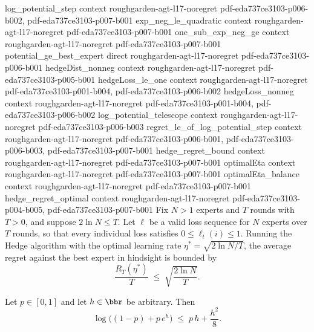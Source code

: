 \begin{theorem}
\proofstep
  {log_potential_step}
  {context}
  {roughgarden-agt-l17-noregret}
  {pdf-eda737ce3103-p006-b002,
    pdf-eda737ce3103-p007-b001}
\proofstep
  {exp_neg_le_quadratic}
  {context}
  {roughgarden-agt-l17-noregret}
  {pdf-eda737ce3103-p007-b001}
\proofstep
  {one_sub_exp_neg_ge}
  {context}
  {roughgarden-agt-l17-noregret}
  {pdf-eda737ce3103-p007-b001}
\proofstep
  {potential_ge_best_expert}
  {direct}
  {roughgarden-agt-l17-noregret}
  {pdf-eda737ce3103-p006-b001}
\proofstep
  {hedgeDist_nonneg}
  {context}
  {roughgarden-agt-l17-noregret}
  {pdf-eda737ce3103-p005-b001}
\proofstep
  {hedgeLoss_le_one}
  {context}
  {roughgarden-agt-l17-noregret}
  {pdf-eda737ce3103-p001-b004,
    pdf-eda737ce3103-p006-b002}
\proofstep
  {hedgeLoss_nonneg}
  {context}
  {roughgarden-agt-l17-noregret}
  {pdf-eda737ce3103-p001-b004,
    pdf-eda737ce3103-p006-b002}
\proofstep
  {log_potential_telescope}
  {context}
  {roughgarden-agt-l17-noregret}
  {pdf-eda737ce3103-p006-b003}
\proofstep
  {regret_le_of_log_potential_step}
  {context}
  {roughgarden-agt-l17-noregret}
  {pdf-eda737ce3103-p006-b001,
    pdf-eda737ce3103-p006-b003,
    pdf-eda737ce3103-p007-b001}
\proofstep
  {hedge_regret_bound}
  {context}
  {roughgarden-agt-l17-noregret}
  {pdf-eda737ce3103-p007-b001}
\proofstep
  {optimalEta}
  {context}
  {roughgarden-agt-l17-noregret}
  {pdf-eda737ce3103-p007-b001}
\proofstep
  {optimalEta_balance}
  {context}
  {roughgarden-agt-l17-noregret}
  {pdf-eda737ce3103-p007-b001}
\proofstep
  {hedge_regret_optimal}
  {context}
  {roughgarden-agt-l17-noregret}
  {pdf-eda737ce3103-p004-b005,
    pdf-eda737ce3103-p007-b001}
Fix $N > 1$ experts and $T$ rounds with $T > 0$, and suppose $2\ln N \le T$. Let $\ell$
be a valid loss sequence for $N$ experts over $T$ rounds, so that every individual loss
satisfies $0 \le \ell_t(i) \le 1$. Running the Hedge algorithm with the optimal learning
rate $\eta^* = \sqrt{2\ln N / T}$, the average regret against the best expert in
hindsight is bounded by
\[
  \frac{R_T(\eta^*)}{T} \;\le\; \sqrt{\frac{2\ln N}{T}}.
\]
\end{theorem}

\begin{lemma}
\label{hoeffding_lemma}
\leanok
{}
Let $p \in [0,1]$ and let $h \in \bbr$ be arbitrary. Then
\[
  \log\!\bigl((1-p) + p\,e^{h}\bigr) \;\le\; p\,h + \frac{h^{2}}{8}.
\]
\end{lemma}

